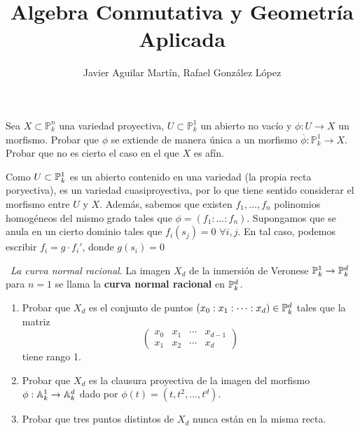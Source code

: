 \documentclass[twoside]{article}
\begin{document}
\title{Algebra Conmutativa y Geometría Aplicada}
\author{Javier Aguilar Martín, Rafael González López}
\maketitle
\begin{ejercicio}{2} Sea $X \subset \mathbb{P}^n_k$ una variedad proyectiva, $U\subset \mathbb{P}^1_k$ un abierto no vacío y $\phi\colon U\rightarrow X$ un morfismo. Probar que $\phi$ se extiende de manera única a un morfismo $\overline{\phi}\colon \mathbb{P}^1_k\rightarrow X$. Probar que no es cierto el caso en el que $X$ es afín.
\end{ejercicio}
\begin{solucion}
Como $U\subset \mathbb{P}^1_k$ es un abierto contenido en una variedad (la propia recta poryectiva), es un variedad cuasiproyectiva, por lo que tiene sentido considerar el morfismo entre $U$ y $X$. Además, sabemos que existen $f_1,\dotsc,f_n$ polinomios homogéneos del mismo grado tales que $\phi = (f_1 : \dotsc : f_n)$. Supongamos que se anula en un cierto dominio tales que $f_i(s_j)=0$ $\forall i,j$. En tal caso, podemos escribir $f_i = g\cdot f_i'$, donde $g(s_i)=0$
\end{solucion}
\newpage 
\begin{ejercicio}{5}\
\emph{La curva normal racional}. La imagen $X_d$ de la inmersión de
Veronese $\mathbb{P}^1_k \to \mathbb{P}^d_k$ para $n = 1$ se llama la \textbf{curva normal racional} en $\mathbb{P}^d_k$.
\begin{enumerate}
\item Probar que $X_d$ es el conjunto de puntos $(x_0 : x_1 : \dots : x_d) \in \mathbb{P}^d_k$ tales que
la matriz 
\[
\begin{pmatrix}
x_0 & x_1 &\cdots& x_{d-1}\\
x_1 & x_2 &\cdots& x_d
\end{pmatrix}
\]
tiene rango 1.
\item Probar que $X_d$ es la clausura proyectiva de la imagen del morfismo $\phi :\mathbb{A}^1_k \to \mathbb{A}^d_k$ dado por $\phi(t) = (t, t^2, \dots , t^d)$.
\item Probar que tres puntos distintos de $X_d$ nunca están en la misma recta.
\end{enumerate}
\end{ejercicio}
\end{document}
